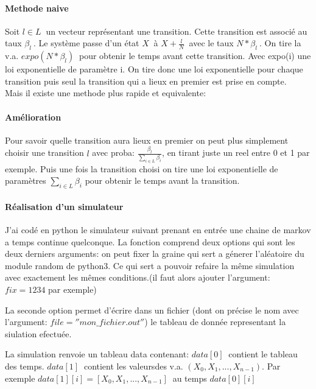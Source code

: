 \documentclass[a4paper]{article}
\begin{document}
\paragraph{Methode naive}

Soit $l \in L \ $ un vecteur représentant une transition. Cette
transition est associé au taux $\beta_l \ $. Le système passe d'un
état $X \ $ à $X+\frac{l}{N} \ $ avec le taux $N*\beta_l \ $. On tire
la v.a.  $expo(N*\beta_l) \ $ pour obtenir le temps avant cette transition. Avec expo(i) une
loi exponentielle de paramètre i. On tire donc une loi exponentielle
pour chaque transition puis seul la transition qui a lieux en premier est
prise en compte. \\

Mais il existe  une methode plus rapide et equivalente:

\paragraph{Amélioration}


Pour savoir quelle transition aura lieux en premier on peut plus
simplement choisir une transition $l$ avec proba:
$\frac{\beta_l}{\sum_{i \in L}\beta_i}$, en tirant juste un reel entre 0 et 1 par exemple.
Puis une fois la transition choisi on tire une loi exponentielle de
paramètres $\sum_{i \in L}\beta_i$ pour obtenir le temps avant la
transition.


\paragraph{Réalisation d'un simulateur} 

J'ai codé en python le simulateur suivant prenant en entrée une chaine
de markov a temps continue quelconque. La fonction comprend deux
options qui sont les deux derniers arguments: on peut fixer la graine
qui sert a génerer l'aléatoire du module random de python3. Ce qui
sert a pouvoir refaire la même simulation avec exactement les mêmes
conditions.(il faut alors ajouter l'argument: $fix=1234$ par exemple)

La seconde option permet d'écrire dans un fichier (dont on
précise le nom avec l'argument: $file=''mon\_fichier.out''$) le tableau
de donnée representant la siulation efectuée.

La simulation renvoie un tableau data contenant: $data[0]\ $ contient le
tableau des temps. $data[1] \ $ contient les valeursdes
v.a. $(X_0,X_1,...,X_{n-1})$.
Par exemple $data[1][i]=[X_0,X_1,...,X_{n-1} ]\ $ au temps $data[0][i]$
\end{document}
